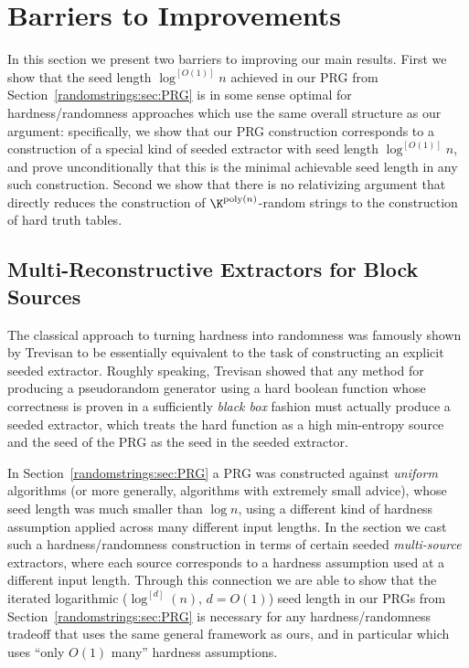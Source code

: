 \section{Barriers to Improvements}
In this section we present two barriers to improving our main results. First we show that the seed length $\log^{[O(1)]}n$ achieved in our PRG from Section~\ref{randomstrings:sec:PRG} is in some sense optimal for hardness/randomness approaches which use the same overall structure as our argument: specifically, we show that our PRG construction corresponds to a construction of a special kind of seeded extractor with seed length $\log^{[O(1)]}n$, and prove unconditionally that this is the minimal achievable seed length in any such construction. Second we show that there is no relativizing argument that directly reduces the construction of $\K^{\poly(n)}$-random strings to the construction of hard truth tables.
\subsection{Multi-Reconstructive Extractors for Block Sources}
The classical approach to turning hardness into randomness \cite{NW94,IW97} was famously shown by Trevisan \cite{trevisan} to be essentially equivalent to the task of constructing an explicit seeded extractor. Roughly speaking, Trevisan showed that any method for producing a pseudorandom generator using a hard boolean function whose correctness is proven in a sufficiently \emph{black box} fashion must actually produce a seeded extractor, which treats the hard function as a high min-entropy source and the seed of the PRG as the seed in the seeded extractor. 

In Section~\ref{randomstrings:sec:PRG} a PRG was constructed against \emph{uniform} algorithms (or more generally, algorithms with extremely small advice), whose seed length was much smaller than $\log n$, using a different kind of hardness assumption applied across many different input lengths. In the section we cast such a hardness/randomness construction in terms of certain seeded \emph{multi-source} extractors, where each source corresponds to a hardness assumption used at a different input length. Through this connection we are able to show that the iterated logarithmic ($\log^{[d]}(n)$, $d= O(1)$) seed length in our PRGs from Section~\ref{randomstrings:sec:PRG} is necessary for any hardness/randomness tradeoff that uses the same general framework as ours, and in particular which uses ``only $O(1)$ many'' hardness assumptions.

